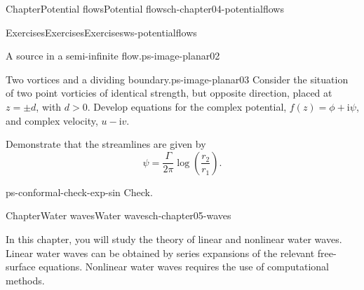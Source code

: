 \documentclass[oneside,10pt,]{book}
\numberwithin{equation}{section}
\newcommand{\im}{\mathrm{i}}
\newcommand{\gt}{>}
\begin{document}
\begin{chapterptx}{Chapter}{Potential flows}{}{Potential flows}{}{}{ch-chapter04-potentialflows}
\begin{exercises-section}{Exercises}{Exercises}{}{Exercises}{}{}{ws-potentialflows}
\begin{divisionexercise}{2}{A source in a semi-infinite flow.}{}{ps-image-planar02}
\end{divisionexercise}%
\begin{divisionexercise}{3}{Two vortices and a dividing boundary.}{}{ps-image-planar03}%
Consider the situation of two point vorticies of identical strength, but opposite direction, placed at \(z = \pm d\), with \(d \gt 0\). Develop equations for the complex potential, \(f(z) = \phi + \im \psi\), and complex velocity, \(u - \im v\).%
\par
Demonstrate that the streamlines are given by%
\begin{equation*}
\psi = \frac{\Gamma}{2\pi}\log \left( \frac{r_2}{r_1}\right).
\end{equation*}
%
\end{divisionexercise}%
\begin{divisionexercise}{4}{}{}{ps-conformal-check-exp-sin}%
Check.%
\end{divisionexercise}%
\end{exercises-section}
\end{chapterptx}
%
%
\typeout{************************************************}
\typeout{************************************************}
%
\begin{chapterptx}{Chapter}{Water waves}{}{Water waves}{}{}{ch-chapter05-waves}
\renewcommand*{\chaptername}{Chapter}
\begin{introduction}{}%
In this chapter, you will study the theory of linear and nonlinear water waves. Linear water waves can be obtained by series expansions of the relevant free-surface equations. Nonlinear water waves requires the use of computational methods.%
\end{introduction}%
\end{chapterptx}
%
%
\typeout{************************************************}
\typeout{************************************************}
%
\end{document}
